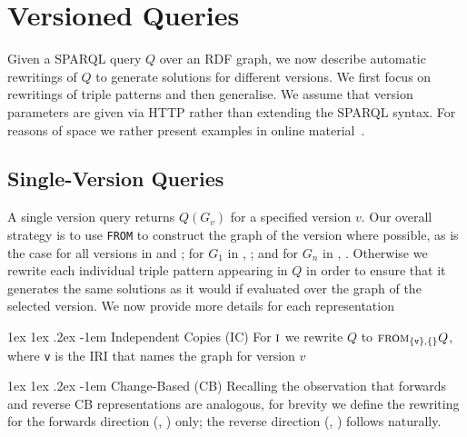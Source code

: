 \documentclass{llncs}
\makeatletter
\renewcommand\paragraph{\@startsection{paragraph}{4}{\z@}%
	{1ex \@plus1ex \@minus.2ex}%
	{-1em}%
	{\normalfont\normalsize\itshape}}
\newcommand{\sfrom}[3]{\ensuremath{\textsc{from}_{#2,#3}#1}}
\makeatother
\begin{document}


\section{Versioned Queries}

Given a SPARQL query $Q$ over an RDF graph, we now describe automatic rewritings of $Q$ to generate solutions for different versions. We first focus on rewritings of triple patterns and then generalise. We assume that version parameters are given via HTTP rather than extending the SPARQL syntax. For reasons of space we rather present examples in online material~\cite{online}.

\subsection{Single-Version Queries} A single version query returns $Q(G_v)$ for a specified version $v$. Our overall strategy is to use \texttt{FROM} to construct the graph of the version where possible, as is the case for all versions in \ic and \tb; for $G_1$ in \cbpd, \cbpi; and for $G_n$ in \cbmd, \cbmi. Otherwise we rewrite each individual triple pattern appearing in $Q$ in order to ensure that it generates the same solutions as it would if evaluated over the graph of the selected version. We now provide more details for each representation

\paragraph{Independent Copies (IC)} For $\textsc{i}$ we rewrite $Q$ to \sfrom{Q}{\{\texttt{v}\}}{\{\}}, where \texttt{v} is the IRI that names the graph for version $v$

\paragraph{Change-Based (CB)} Recalling the observation that forwards and reverse CB representations are analogous, for brevity we define the rewriting for the forwards direction (\cbpd, \cbpi) only; the reverse direction (\cbmd, \cbmi) follows naturally. 
\end{document}
